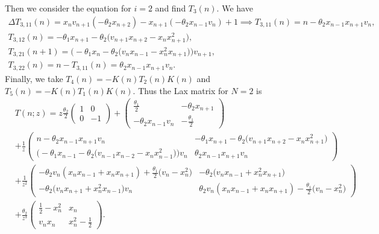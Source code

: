 \documentclass[pdftex]{sigma}%
\numberwithin{equation}{section}
\begin{document}
\begin{Example}
		Then we consider the equation for $i=2$ and find $T_3(n)$. We have
\begin{gather*}
\Delta T_{3,11}(n)=x_nv_{n+1}(-\theta_2x_{n+2}) -x_{n+1}(-\theta_2 x_{n-1}v_{n})+1\! \implies \! T_{3,11}(n)=n-\theta_2 x_{n-1}x_{n+1}v_n,
\\
T_{3,12}(n)=-\theta_1x_{n+1}-\theta_2\big(v_{n+1}x_{n+2}-x_nx_{n+1}^2\big),
\\
T_{3,21}(n+1)=\bigl(-\theta_1x_{n}-\theta_2\big(v_nx_{n-1}-x_n^2x_{n+1}\big)\bigr)v_{n+1},
\\
T_{3,22}(n)= n-T_{3,11}(n)=\theta_2 x_{n-1}x_{n+1}v_n.
\end{gather*}
Finally, we take $T_4(n)=-K(n)T_2(n)K(n)$ and $T_5(n)=-K(n)T_1(n)K(n)$. Thus the Lax matrix for $N=2$ is
\begin{align*}
&T(n;z)=z\frac{\theta_2}{2}\begin{pmatrix}
				1&0\\0&-1
			\end{pmatrix}+\begin{pmatrix}
				\frac{\theta_1}{2}&-\theta_2x_{n+1}\\
				-\theta_2 x_{n-1}v_{n}&-\frac{\theta_1}{2}
			\end{pmatrix}
\\
&+\frac{1}{z}\begin{pmatrix}
				n-\theta_2 x_{n-1}x_{n+1}v_n & -\theta_1x_{n+1}-\theta_2\big(v_{n+1}x_{n+2}-x_nx_{n+1}^2\big)\\
				\bigl(-\theta_1x_{n-1}-\theta_2\big(v_{n-1}x_{n-2}-x_nx_{n-1}^2\big)\bigr)v_{n} & \theta_2 x_{n-1}x_{n+1}v_n
			\end{pmatrix}
\\
			&+\frac{1}{z^2}\begin{pmatrix}
				-\theta_2v_n(x_nx_{n-1}+x_nx_{n+1})+\frac{\theta_1}{2}\big(v_n-x_n^2\big)	& -\theta_2\big(v_nx_{n-1}+x_n^2x_{n+1}\big)\\
				-\theta_2\big(v_nx_{n+1}+x_n^2x_{n-1}\big)v_n &\theta_2v_n(x_nx_{n-1}+x_nx_{n+1})-\frac{\theta_1}{2}\big(v_n-x_n^2\big)
			\end{pmatrix}\\&+
			\frac{\theta_2}{z^3}\begin{pmatrix}
				\frac{1}{2}-x_n^2&x_n\\
				v_{n}x_n&x_n^2-\frac{1}{2}
\end{pmatrix}\!.
\end{align*}
\end{Example}
\end{document}
